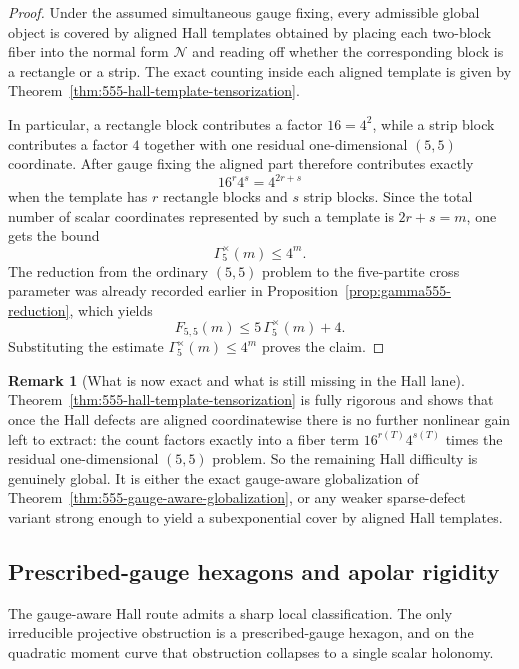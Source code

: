\documentclass[11pt]{article}
\theoremstyle{definition}
\newtheorem{remark}[theorem]{Remark}
\newcommand{\1}{\mathbf{1}}
\begin{document}
\begin{proof}
Under the assumed simultaneous gauge fixing, every admissible global object is covered by aligned Hall templates obtained by placing each two-block fiber into the normal form $\mathcal N$ and reading off whether the corresponding block is a rectangle or a strip.
The exact counting inside each aligned template is given by Theorem~\ref{thm:555-hall-template-tensorization}.

In particular, a rectangle block contributes a factor $16=4^2$, while a strip block contributes a factor $4$ together with one residual one-dimensional $(5,5)$ coordinate.
After gauge fixing the aligned part therefore contributes exactly
\[
16^r4^s=4^{2r+s}
\]
when the template has $r$ rectangle blocks and $s$ strip blocks.
Since the total number of scalar coordinates represented by such a template is $2r+s=m$, one gets the bound
\[
\Gamma_5^\times(m)\le 4^m.
\]
The reduction from the ordinary $(5,5)$ problem to the five-partite cross parameter was already recorded earlier in Proposition~\ref{prop:gamma555-reduction}, which yields
\[
F_{5,5}(m)\le 5\,\Gamma_5^\times(m)+4.
\]
Substituting the estimate $\Gamma_5^\times(m)\le 4^m$ proves the claim.
\end{proof}

\begin{remark}[What is now exact and what is still missing in the Hall lane]\label{rem:555-hall-template-status}
Theorem~\ref{thm:555-hall-template-tensorization} is fully rigorous and shows that once the Hall defects are aligned coordinatewise there is no further nonlinear gain left to extract:
the count factors exactly into a fiber term $16^{r(T)}4^{s(T)}$ times the residual one-dimensional $(5,5)$ problem.
So the remaining Hall difficulty is genuinely global.
It is either the exact gauge-aware globalization of Theorem~\ref{thm:555-gauge-aware-globalization}, or any weaker sparse-defect variant strong enough to yield a subexponential cover by aligned Hall templates.
\end{remark}




\subsection*{Prescribed-gauge hexagons and apolar rigidity}
The gauge-aware Hall route admits a sharp local classification. The only irreducible projective obstruction is a prescribed-gauge hexagon, and on the quadratic moment curve that obstruction collapses to a single scalar holonomy.
\end{document}
